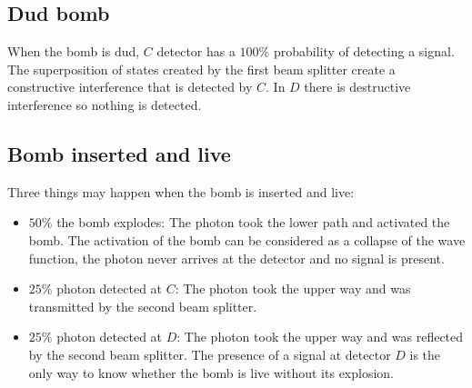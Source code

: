 	\subsection{Dud bomb}
	When the bomb is dud, $C$ detector has a $100\%$ probability of detecting a signal.
	The superposition of states created by the first beam splitter create a constructive interference that is detected by $C$.
	In $D$ there is destructive interference so nothing is detected.

	\subsection{Bomb inserted and live}
	Three things may happen when the bomb is inserted and live:

	\begin{multicols}{2}
		\begin{itemize}
			\item $50\%$ the bomb explodes: The photon took the lower path and activated the bomb.
				The activation of the bomb can be considered as a collapse of the wave function, the photon never arrives at the detector and no signal is present.
			\item $25\%$ photon detected at $C$: The photon took the upper way and was transmitted by the second beam splitter.
			\item $25\%$ photon detected at $D$: The photon took the upper way and was reflected by the second beam splitter.
				The presence of a signal at detector $D$ is the only way to know whether the bomb is live without its explosion.
		\end{itemize}
	\end{multicols}
